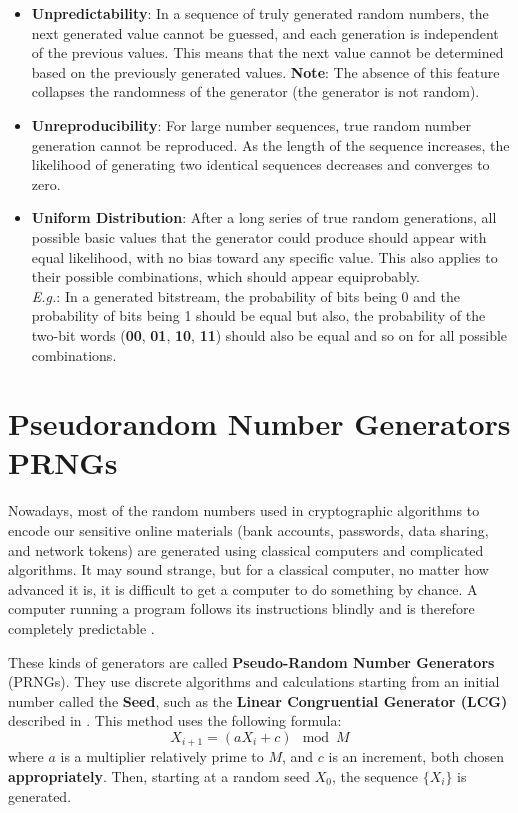 \begin{itemize}
    \item \textbf{Unpredictability}: In a sequence of truly generated random numbers, the next generated value cannot be guessed, and each generation is independent of the previous values. This means that the next value cannot be determined based on the previously generated values. \textbf{Note}: The absence of this feature collapses the randomness of the generator (the generator is not random).
    
    \item \textbf{Unreproducibility}: For large number sequences, true random number generation cannot be reproduced. As the length of the sequence increases, the likelihood of generating two identical sequences decreases and converges to zero.
    
    \item \textbf{Uniform Distribution}: After a long series of true random generations, all possible basic values that the generator could produce should appear with equal likelihood, with no bias toward any specific value. This also applies to their possible combinations, which should appear equiprobably. \\
    \textit{E.g.}: In a generated bitstream, the probability of bits being 0 and the probability of bits being 1 should be equal but also, the probability of the two-bit words (\textbf{00}, \textbf{01}, \textbf{10}, \textbf{11}) should also be equal and so on for all possible combinations.
\end{itemize}



\section{Pseudorandom Number Generators PRNGs}
Nowadays, most of the random numbers used in cryptographic algorithms to encode our sensitive online materials (bank accounts, passwords, data sharing, and network tokens) are generated using classical computers and complicated algorithms. It may sound strange, but for a classical computer, no matter how advanced it is, it is difficult to get a computer to do something by chance. A computer running a program follows its instructions blindly and is therefore completely predictable \cite{haahr1999random}.

These kinds of generators are called \textbf{Pseudo-Random Number Generators} (PRNGs). They use discrete algorithms and calculations starting from an initial number called the \textbf{Seed}, such as the \textbf{Linear Congruential Generator (LCG)} described in \cite{LCG}. This method uses the following formula:
\begin{equation}
X_{i+1} = (aX_i + c) \mod M
\end{equation}
where \( a \) is a multiplier relatively prime to \( M \), and \( c \) is an increment, both chosen \textbf{appropriately}. Then, starting at a random seed \( X_0 \), the sequence \( \{X_i\} \) is generated.

